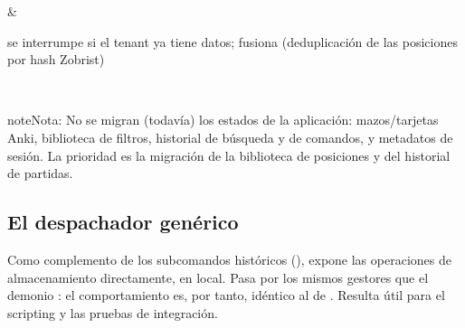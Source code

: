 \documentclass[letterpaper,10pt,spanish]{sphinxmanual}
\begin{document}
\begin{savenotes}
\begin{tabular}[t]{}
\begin{varwidth}[t]{}
\sphinxbeforeendvarwidth
\end{varwidth}%
&\begin{varwidth}[t]{}
\sphinxAtStartPar
{} se interrumpe si el tenant ya tiene datos;  fusiona (deduplicación de las posiciones por hash Zobrist)
\sphinxbeforeendvarwidth
\end{varwidth}%
\\
\sphinxbottomrule
\end{tabular}
\sphinxtableafterendhook\par
\sphinxattableend\end{savenotes}

\begin{sphinxadmonition}{note}{Nota:}
\sphinxAtStartPar
No se migran (todavía) los estados de la aplicación: mazos/tarjetas Anki, biblioteca de filtros, historial de búsqueda y de comandos, y metadatos de sesión. La prioridad es la migración de la biblioteca de posiciones y del historial de partidas.
\end{sphinxadmonition}


\subsection{El despachador genérico }
\label{\detokenize{mode_headless:le-dispatcher-generique-call}}\label{\detokenize{mode_headless:headless-call}}
\sphinxAtStartPar
Como complemento de los subcomandos históricos ({\hyperref[\detokenize{cli:cli}]{}}),  expone  las operaciones de almacenamiento directamente, en local. Pasa por los mismos gestores que el demonio : el comportamiento es, por tanto, idéntico al de . Resulta útil para el scripting y las pruebas de integración.
\end{document}
